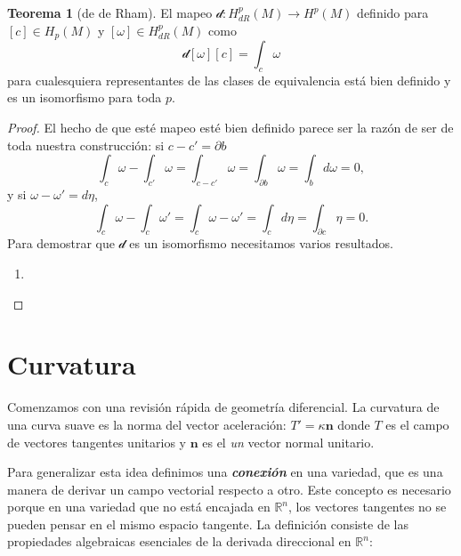 \documentclass[spanish]{article}
\theoremstyle{definition}
\newtheorem*{teo}{Teorema}
\newcommand{\R}{\mathbb{R}}
\begin{document}
	\begin{teo}[de de Rham]
		El  mapeo $\mathcal{d}:H^p_{dR}(M)\to H^p(M)$ definido para $[c]\in H_p(M)$ y $[\omega]\in H^p_{dR}(M)$ como
		\[\mathcal{d}[\omega][c]=\int_c\omega\]
		para cualesquiera representantes de las clases de equivalencia está bien definido y es un isomorfismo para toda $p$.
	\end{teo}
	\begin{proof}
		El hecho de que esté mapeo esté bien definido parece ser la razón de ser de toda nuestra construcción: si $c-c'=\partial b$
		\[\int_c\omega-\int_{c'}\omega=\int_{c-c'}\omega=\int_{\partial b}\omega=\int_bd\omega=0,\]
		y si $\omega-\omega'=d\eta$,
		\[\int_c\omega-\int_c\omega'=\int_c\omega-\omega'=\int_cd\eta=\int_{\partial c}\eta=0.\]
		Para demostrar que $\mathcal{d}$ es un isomorfismo necesitamos varios resultados.
		\begin{enumerate}
			\item 
		\end{enumerate}
	\end{proof}
	
	
	
	\iffalse
	\clearpage
	\section{Curvatura}
	Comenzamos con una revisión rápida de geometría diferencial. La curvatura de una curva suave es la norma del vector aceleración: $T'=\kappa\mathbf{n}$ donde $T$ es el campo de vectores tangentes unitarios y $\mathbf{n}$ es el \textit{un} vector normal unitario.
	
	Para generalizar esta idea definimos una \textit{\textbf{conexión}} en una variedad, que es una manera de derivar un campo vectorial respecto a otro. Este concepto es necesario porque en una variedad que no está encajada en $\R^n$, los vectores tangentes no se pueden pensar en el mismo espacio tangente. La definición consiste de las propiedades algebraicas esenciales de la derivada direccional en $\R^n$:
	
\end{document}
